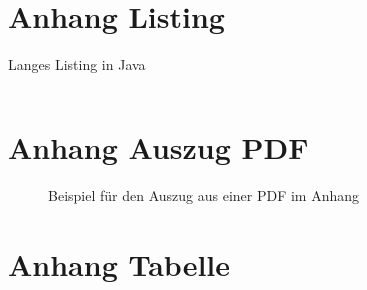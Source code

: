 \appendix
\clearpage
{}
\chapter{Anhang Listing}


\begin{longlisting}
\label{app:longlisting}
\caption{Langes Listing in Java}
\label{listing:longlisting}
\inputminted{java}{04_Artefakte/03_Listings/Daten.java}
\end{longlisting}

\chapter{Anhang Auszug PDF}
\label{app:auszugPDF}
\begin{figure}[h]
    \centering
    \caption[Beispiel für den Auszug aus einer PDF]{Beispiel für den Auszug aus einer PDF im Anhang}
\end{figure}

\chapter{Anhang Tabelle}
\label{app:longtable}

